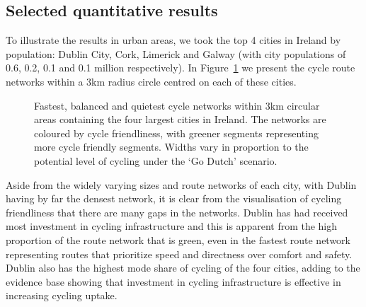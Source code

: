\documentclass[
  super,
  preprint,
  3p]{elsarticle}
\begin{document}
\subsection{Selected quantitative results}\label{sec-quantiative}

To illustrate the results in urban areas, we took the top 4 cities in
Ireland by population: Dublin City, Cork, Limerick and Galway (with city
populations of 0.6, 0.2, 0.1 and 0.1 million respectively). In
Figure~\ref{fig-city-results} we present the cycle route networks within
a 3km radius circle centred on each of these cities.

\begin{figure}


\caption{\label{fig-city-results}Fastest, balanced and quietest cycle
networks within 3km circular areas containing the four largest cities in
Ireland. The networks are coloured by cycle friendliness, with greener
segments representing more cycle friendly segments. Widths vary in
proportion to the potential level of cycling under the `Go Dutch'
scenario.}

\end{figure}%

Aside from the widely varying sizes and route networks of each city,
with Dublin having by far the densest network, it is clear from the
visualisation of cycling friendliness that there are many gaps in the
networks. Dublin has had received most investment in cycling
infrastructure and this is apparent from the high proportion of the
route network that is green, even in the fastest route network
representing routes that prioritize speed and directness over comfort
and safety. Dublin also has the highest mode share of cycling of the
four cities, adding to the evidence base showing that investment in
cycling infrastructure is effective in increasing cycling uptake.
\end{document}
